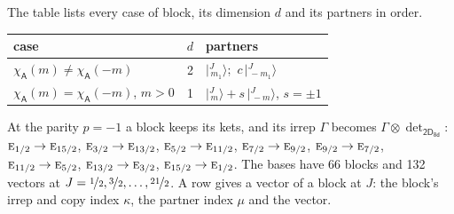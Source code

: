 \documentclass[10pt,a4paper]{article}
\numberwithin{equation}{section}
\newcommand{\grp}[1]{\mathsf{#1}}
\newcommand{\irr}[1]{\text{\normalfont\scshape #1}}
\newcommand{\chiA}{\chi_{\grp{A}}}
\newcommand{\irrprod}{\otimes}
\newcommand{\mult}{\kappa}
\newcommand{\intx}{\mu}
\newcommand{\jm}[2]{\bigl\lvert{}^{#1}_{\,#2}\bigr\rangle}
\begin{document}
\leavevmode\label{n:head.case}\label{n:head.partners}The table lists every case of block, its dimension $d$ and its partners in order.
\begin{center}\begin{tabular}{@{}lrl@{}}\toprule
case & $d$ & partners\\\midrule
$\chiA(m) \ne \chiA(-m)$ & 2 & $\jm{J}{m_1}$;\ $c\,\jm{J}{-m_1}$\\
$\chiA(m) = \chiA(-m)$, $m > 0$ & 1 & $\jm{J}{m} + s\,\jm{J}{-m}$, $s = \pm1$\\
\bottomrule\end{tabular}\end{center}
At the parity $p = -1$ a block keeps its kets, and its irrep $\Gamma$ becomes $\Gamma \irrprod \det_{\grp{2D_{8d}}}$: $\irr{e}_{1/2} \to \irr{e}_{15/2}$, $\irr{e}_{3/2} \to \irr{e}_{13/2}$, $\irr{e}_{5/2} \to \irr{e}_{11/2}$, $\irr{e}_{7/2} \to \irr{e}_{9/2}$, $\irr{e}_{9/2} \to \irr{e}_{7/2}$, $\irr{e}_{11/2} \to \irr{e}_{5/2}$, $\irr{e}_{13/2} \to \irr{e}_{3/2}$, $\irr{e}_{15/2} \to \irr{e}_{1/2}$.
The bases have 66 blocks and 132 vectors at $J = \nicefrac{1}{2}, \nicefrac{3}{2}, \dots, \nicefrac{21}{2}$. \label{n:head.vector}A row gives a vector of a block at $J$: the block's irrep and copy index $\mult$, the partner index $\intx$ and the vector.
\end{document}
